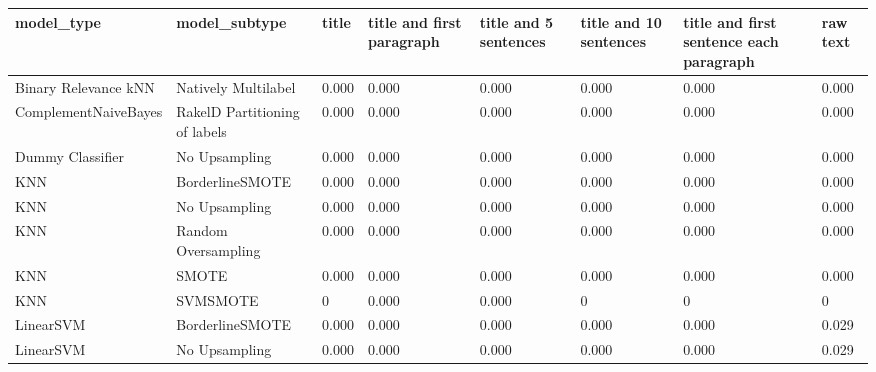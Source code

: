 \begin{tabular}{llllllll}
\toprule
                     model\_type &                 model\_subtype &     title & title and first paragraph & title and 5 sentences & title and 10 sentences & title and first sentence each paragraph &  raw text \\
\midrule
           Binary Relevance kNN &           Natively Multilabel &     0.000 &                     0.000 &                 0.000 &                  0.000 &                                   0.000 &     0.000 \\
           ComplementNaiveBayes & RakelD Partitioning of labels &     0.000 &                     0.000 &                 0.000 &                  0.000 &                                   0.000 &     0.000 \\
               Dummy Classifier &                 No Upsampling &     0.000 &                     0.000 &                 0.000 &                  0.000 &                                   0.000 &     0.000 \\
                            KNN &               BorderlineSMOTE &     0.000 &                     0.000 &                 0.000 &                  0.000 &                                   0.000 &     0.000 \\
                            KNN &                 No Upsampling &     0.000 &                     0.000 &                 0.000 &                  0.000 &                                   0.000 &     0.000 \\
                            KNN &           Random Oversampling &     0.000 &                     0.000 &                 0.000 &                  0.000 &                                   0.000 &     0.000 \\
                            KNN &                         SMOTE &     0.000 &                     0.000 &                 0.000 &                  0.000 &                                   0.000 &     0.000 \\
                            KNN &                      SVMSMOTE &         0 &                     0.000 &                 0.000 &                      0 &                                       0 &         0 \\
                      LinearSVM &               BorderlineSMOTE &     0.000 &                     0.000 &                 0.000 &                  0.000 &                                   0.000 &     0.029 \\
                      LinearSVM &                 No Upsampling &     0.000 &                     0.000 &                 0.000 &                  0.000 &                                   0.000 &     0.029 \\

\end{tabular}
